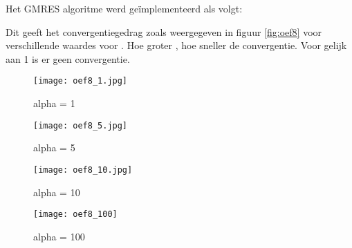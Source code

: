 Het GMRES algoritme werd ge\"implementeerd als volgt:


Dit geeft het convergentiegedrag zoals weergegeven in figuur \ref{fig:oef8}  voor verschillende waardes voor . Hoe groter , hoe sneller de convergentie. Voor  gelijk aan 1 is er geen convergentie.

\begin{figure*}
	\centering

        \begin{subfigure}[b]{0.475\textwidth}
	\centering
       	\texttt{[image: oef8\_1.jpg]}
        \caption{{\small alpha = 1}}    
        \label{fig:oef8_1}
        \end{subfigure}

        \hfill

        \begin{subfigure}[b]{0.475\textwidth}
	\centering 
        \texttt{[image: oef8\_5.jpg]}
        \caption{{\small alpha = 5}}    
            \label{fig:oef8_5}
        \end{subfigure}

	\bigskip        

        \begin{subfigure}[b]{0.475\textwidth}
	\centering
   	\texttt{[image: oef8\_10.jpg]}
        \caption{{\small alpha = 10}}    
            \label{fig:oef8_10}
        \end{subfigure}

        \hfill

        \begin{subfigure}[b]{0.475\textwidth}
            \centering 
            \texttt{[image: oef8\_100]}
            \caption{{\small alpha = 100}}
            \label{fig:oef8_100}
        \end{subfigure}

        \caption{convergentiegedrag voor verschillende waardes voor alpha} 
        \label{fig:oef8}
    \end{figure*}